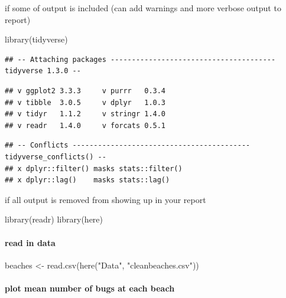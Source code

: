 \documentclass[
]{article}
\newenvironment{Shaded}{\begin{snugshade}}{\end{snugshade}}
\newcommand{\FunctionTok}[1]{\textcolor[rgb]{0.00,0.00,0.00}{#1}}
\newcommand{\NormalTok}[1]{#1}
\newcommand{\OtherTok}[1]{\textcolor[rgb]{0.56,0.35,0.01}{#1}}
\newcommand{\StringTok}[1]{\textcolor[rgb]{0.31,0.60,0.02}{#1}}
\begin{document}
if some of output is included (can add warnings and more verbose output
to report)

\begin{Shaded}
\begin{Highlighting}[]
\FunctionTok{library}\NormalTok{(tidyverse)}
\end{Highlighting}
\end{Shaded}

\begin{verbatim}
## -- Attaching packages --------------------------------------- tidyverse 1.3.0 --
\end{verbatim}

\begin{verbatim}
## v ggplot2 3.3.3     v purrr   0.3.4
## v tibble  3.0.5     v dplyr   1.0.3
## v tidyr   1.1.2     v stringr 1.4.0
## v readr   1.4.0     v forcats 0.5.1
\end{verbatim}

\begin{verbatim}
## -- Conflicts ------------------------------------------ tidyverse_conflicts() --
## x dplyr::filter() masks stats::filter()
## x dplyr::lag()    masks stats::lag()
\end{verbatim}

if all output is removed from showing up in your report

\begin{Shaded}
\begin{Highlighting}[]
\FunctionTok{library}\NormalTok{(readr)}
\FunctionTok{library}\NormalTok{(here)}
\end{Highlighting}
\end{Shaded}

\hypertarget{read-in-data}{%
\paragraph{read in data}\label{read-in-data}}

\begin{Shaded}
\begin{Highlighting}[]
\NormalTok{beaches }\OtherTok{\textless{}{-}} \FunctionTok{read.csv}\NormalTok{(}\FunctionTok{here}\NormalTok{(}\StringTok{"Data"}\NormalTok{, }\StringTok{"cleanbeaches.csv"}\NormalTok{))}
\end{Highlighting}
\end{Shaded}

\hypertarget{plot-mean-number-of-bugs-at-each-beach}{%
\paragraph{plot mean number of bugs at each
beach}\label{plot-mean-number-of-bugs-at-each-beach}}
\end{document}
